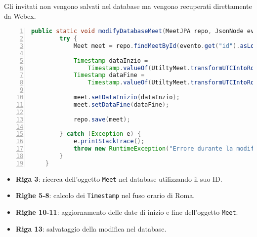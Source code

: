 Gli invitati non vengono salvati nel database ma vengono recuperati direttamente da Webex.
\begin{lstlisting}[language=java, frame=lines, basicstyle=\ttfamily\scriptsize, numbers=left, 
	caption={modifica meet a database}, label={modifica_meet_a_database}]
    public static void modifyDatabaseMeet(MeetJPA repo, JsonNode evento) {
		try {
			Meet meet = repo.findMeetById(evento.get("id").asLong());

			Timestamp dataInzio = 
                Timestamp.valueOf(UtiltyMeet.transformUTCIntoRomeTimezone(evento.get("start").asText()));
			Timestamp dataFine = 
                Timestamp.valueOf(UtiltyMeet.transformUTCIntoRomeTimezone(evento.get("end").asText()));

			meet.setDataInizio(dataInzio);
			meet.setDataFine(dataFine);

			repo.save(meet);

		} catch (Exception e) {
			e.printStackTrace();
			throw new RuntimeException("Errore durante la modifica del meeting a database", e);
		}
	}
\end{lstlisting}
\begin{itemize}
    \item \textbf{Riga 3}: ricerca dell'oggetto \texttt{Meet} nel database utilizzando il suo ID.
    \item \textbf{Righe 5-8}: calcolo dei \texttt{Timestamp} nel fuso orario di Roma.
    \item \textbf{Righe 10-11}: aggiornamento delle date di inizio e fine dell'oggetto \texttt{Meet}.
    \item \textbf{Riga 13}: salvataggio della modifica nel database.
\end{itemize}